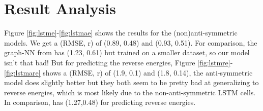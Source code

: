 \documentclass{article}
\begin{document}
\section{Result Analysis}

Figure \ref{fig:lstme}-\ref{fig:lstmae} shows the results for the (non)anti-symmetric models. We get a (RMSE, r) of (0.89, 0.48) and (0.93, 0.51). For comparison, the graph-NN from \citep{Wang2021} has (1.23, 0.61) but trained on a smaller dataset, so our model isn't that bad! But for predicting the reverse energies, Figure \ref{fig:lstmre}-\ref{fig:lstmare} shows a (RMSE, r) of (1.9, 0.1) and (1.8, 0.14), the anti-symmetric model does slightly better but they both seem to be pretty bad at generalizing to reverse energies, which is most likely due to the non-anti-symmetric LSTM cells. In comparison, \citep{Wang2021} has (1.27,0.48) for predicting reverse energies.
\end{document}
